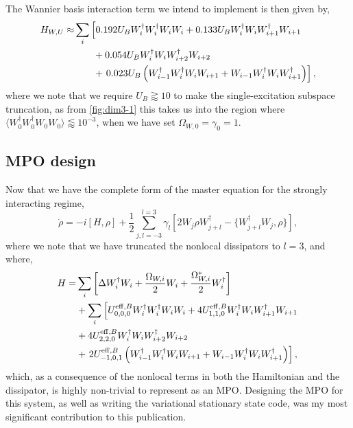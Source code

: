 The Wannier basis interaction term we intend to implement is then given by,
\begin{align}
	H_{W,U} \approx &\sum_{i} \left[ 0.192U_{B}W_{i}^{\dagger}W_{i}^{\dagger}W_{i}W_{i} + 0.133U_{B}W_{i}^{\dagger}W_{i}W_{i+1}^{\dagger}W_{i+1} \right. \notag \\ 
	&\qquad+ 0.054U_{B}W_{i}^{\dagger}W_{i}W_{i+2}^{\dagger}W_{i+2} \notag \\ 
	&\qquad+ \left. 0.023U_{B}\left(W_{i-1}^{\dagger}W_{i}^{\dagger}W_{i}W_{i+1} + W_{i-1}W_{i}^{\dagger}W_{i}W_{i+1}^{\dagger}\right)\right],
	\label{eq:dim3-1}
\end{align}
where we note that we require \(U_{B} \gtrapprox 10\) to make the single-excitation subspace truncation, as from \cref{fig:dim3-1} this takes us into the region where \(\langle W_{0}^{\dagger}W_{0}^{\dagger}W_{0}W_{0} \rangle \lessapprox 10^{-3}\), when we have set \(\Omega_{W,0} = \gamma_{0} = 1\).

\subsection{MPO design}
Now that we have the complete form of the master equation for the strongly interacting regime,
\begin{equation}
	\dot{\rho} = -i\left[H, \rho\right] + \frac{1}{2}\sum_{j,l=-3}^{l=3}\gamma_{l}\left[2W_{j}\rho W_{j+l}^{\dagger} - \{W_{j+l}^{\dagger}W_{j}, \rho\}\right],
	\label{eq:dim3-2}
\end{equation}
where we note that we have truncated the nonlocal dissipators to \(l=3\), and where,
\begin{align}
	H = &\sum_{i}\left[\Delta W_{i}^{\dagger}W_{i} + \frac{\Omega_{W,i}}{2}W_{i} + \frac{\Omega_{W,i}^{*}}{2}W_{i}^{\dagger}\right] \notag \\
	&+ \sum_{i}\left[ U^{\mathrm{eff},B}_{0,0,0}W_{i}^{\dagger}W_{i}^{\dagger}W_{i}W_{i} + 4U^{\mathrm{eff},B}_{1,1,0}W_{i}^{\dagger}W_{i}W_{i+1}^{\dagger}W_{i+1} \right. \notag \\ 
	&+ 4U^{\mathrm{eff},B}_{2,2,0}W_{i}^{\dagger}W_{i}W_{i+2}^{\dagger}W_{i+2} \notag \\ 
	&+ \left.2U^{\mathrm{eff},B}_{-1,0,1}\left(W_{i-1}^{\dagger}W_{i}^{\dagger}W_{i}W_{i+1} + W_{i-1}W_{i}^{\dagger}W_{i}W_{i+1}^{\dagger}\right) \right],
	\label{eq:dim3-3}
\end{align}
which, as a consequence of the nonlocal terms in both the Hamiltonian and the dissipator, is highly non-trivial to represent as an MPO. Designing the MPO for this system, as well as writing the variational stationary state code, was my most significant contribution to this publication. 

